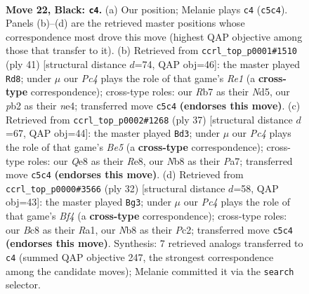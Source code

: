 \documentclass[11pt]{article}
\begin{document}
\clearpage

\begin{figure}[p]\centering
\begin{subfigure}{0.46\textwidth}\centering
\resizebox{\linewidth}{!}{%
\newchessgame
\chessboard[
  setfen={1nb1qrk1/1r3ppp/8/2pQPp2/p4P2/6K1/PPP3PP/R4BNR b - - 0 22},
  showmover=false,
  pgfstyle=straightmove, color=movearrow, markmove={c5-c4}
]}
\caption{}
\end{subfigure}\hfill
\begin{subfigure}{0.46\textwidth}\centering
\resizebox{\linewidth}{!}{%
\newchessgame
\chessboard[
  setfen={4rrk1/1b1q2p1/pp1pp2p/3n4/3PN3/1Q5P/PP3PP1/R3RBK1 b - - 0 21},
  showmover=false,
  pgfstyle=straightmove, color=movearrow, markmove={e8-d8}
]}
\caption{}
\end{subfigure}
\\[4pt]
\begin{subfigure}{0.46\textwidth}\centering
\resizebox{\linewidth}{!}{%
\newchessgame
\chessboard[
  setfen={4r1rk/pp1q1ppp/2n5/2ppP1QN/4bP2/2P5/PP4PP/R1B1R1K1 b - - 0 19},
  showmover=false,
  pgfstyle=straightmove, color=movearrow, markmove={e4-d3}
]}
\caption{}
\end{subfigure}\hfill
\begin{subfigure}{0.46\textwidth}\centering
\resizebox{\linewidth}{!}{%
\newchessgame
\chessboard[
  setfen={r1b2rk1/2p2pp1/p1p5/4P2p/P1q2B1P/2P2Q2/2P2PP1/R4RK1 w - - 3 17},
  showmover=false,
  pgfstyle=straightmove, color=movearrow, markmove={f4-g3}
]}
\caption{}
\end{subfigure}
\caption{\textbf{Move 22, Black: \texttt{c4}.} (a) Our position; Melanie plays \texttt{c4} (\texttt{c5c4}). Panels (b)--(d) are the retrieved master positions whose correspondence most drove this move (highest QAP objective among those that transfer to it). (b) Retrieved from \texttt{ccrl\_top\_p0001\#1510} (ply 41) [structural distance $d$=74, QAP obj=46]: the master played \texttt{Rd8}; under $\mu$ our \emph{Pc4} plays the role of that game's \emph{Re1} (a \textbf{cross-type} correspondence); cross-type roles: our \emph{R}b7 as their \emph{N}d5, our \emph{p}b2 as their \emph{n}e4; transferred move \texttt{c5c4} \textbf{(endorses this move)}. (c) Retrieved from \texttt{ccrl\_top\_p0002\#1268} (ply 37) [structural distance $d$=67, QAP obj=44]: the master played \texttt{Bd3}; under $\mu$ our \emph{Pc4} plays the role of that game's \emph{Be5} (a \textbf{cross-type} correspondence); cross-type roles: our \emph{Q}e8 as their \emph{R}e8, our \emph{N}b8 as their \emph{P}a7; transferred move \texttt{c5c4} \textbf{(endorses this move)}. (d) Retrieved from \texttt{ccrl\_top\_p0000\#3566} (ply 32) [structural distance $d$=58, QAP obj=43]: the master played \texttt{Bg3}; under $\mu$ our \emph{Pc4} plays the role of that game's \emph{Bf4} (a \textbf{cross-type} correspondence); cross-type roles: our \emph{B}c8 as their \emph{R}a1, our \emph{N}b8 as their \emph{P}c2; transferred move \texttt{c5c4} \textbf{(endorses this move)}. Synthesis: 7 retrieved analogs transferred to \texttt{c4} (summed QAP objective 247, the strongest correspondence among the candidate moves); Melanie committed it via the \texttt{search} selector.}
\label{fig:thought-m43}
\end{figure}
\end{document}

